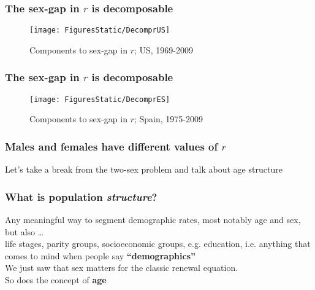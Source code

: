 \documentclass{beamer}
\begin{document}

\begin{frame}
  \frametitle{The sex-gap in $r$ is decomposable}
  \vspace{-2em}
\begin{figure}
\centering
\caption*{Components to sex-gap in $r$; US, 1969-2009}
\texttt{[image: FiguresStatic/DecomprUS]}
\end{figure}
\end{frame}


\begin{frame}
  \frametitle{The sex-gap in $r$ is decomposable}
  \vspace{-2em}
\begin{figure}
\centering
\caption*{Components to sex-gap in $r$; Spain, 1975-2009}
\texttt{[image: FiguresStatic/DecomprES]}
\end{figure}
\end{frame}


\begin{frame}
  \frametitle{Males and females have different values of $r$}
Let's take a break from the two-sex problem and talk about age structure
\end{frame}

\begin{frame}
\frametitle{What is population \textit{structure}?}
 Any meaningful way to segment demographic rates, most notably age
and sex, but also \ldots \\
\vspace{1em}
 life stages, parity groups, socioeconomic groups, e.g. education,
i.e. anything that comes to mind when people say \textbf{``demographics''} \\
\vspace{1em}
 We just saw that sex matters for the classic renewal equation. \\
\vspace{1em}
 So does the concept of \textbf{age}
\end{frame}

\end{document}
